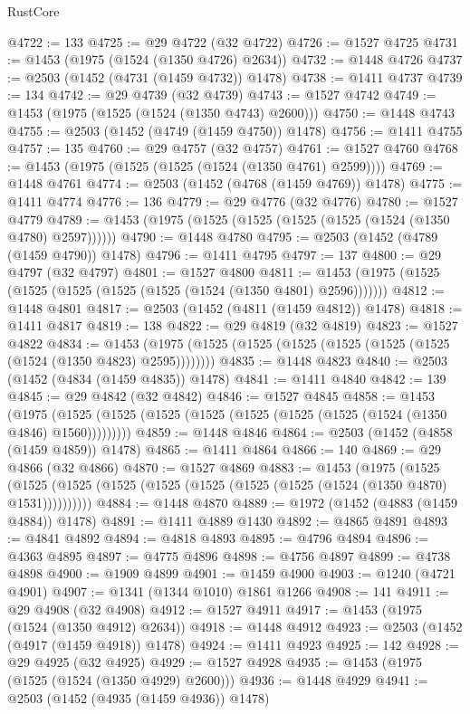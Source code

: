 \begin{lexlean}{RustCore}
\begin{coremodule}
@4722 := 133
@4725 := @29 @4722 (@32 @4722)
@4726 := @1527 @4725
@4731 := @1453 (@1975 (@1524 (@1350 @4726) @2634))
@4732 := @1448 @4726
@4737 := @2503 (@1452 (@4731 (@1459 @4732)) @1478)
@4738 := @1411 @4737
@4739 := 134
@4742 := @29 @4739 (@32 @4739)
@4743 := @1527 @4742
@4749 := @1453 (@1975 (@1525 (@1524 (@1350 @4743) @2600)))
@4750 := @1448 @4743
@4755 := @2503 (@1452 (@4749 (@1459 @4750)) @1478)
@4756 := @1411 @4755
@4757 := 135
@4760 := @29 @4757 (@32 @4757)
@4761 := @1527 @4760
@4768 := @1453 (@1975 (@1525 (@1525 (@1524 (@1350 @4761) @2599))))
@4769 := @1448 @4761
@4774 := @2503 (@1452 (@4768 (@1459 @4769)) @1478)
@4775 := @1411 @4774
@4776 := 136
@4779 := @29 @4776 (@32 @4776)
@4780 := @1527 @4779
@4789 := @1453 (@1975 (@1525 (@1525 (@1525 (@1525 (@1524 (@1350 @4780) @2597))))))
@4790 := @1448 @4780
@4795 := @2503 (@1452 (@4789 (@1459 @4790)) @1478)
@4796 := @1411 @4795
@4797 := 137
@4800 := @29 @4797 (@32 @4797)
@4801 := @1527 @4800
@4811 := @1453 (@1975 (@1525 (@1525 (@1525 (@1525 (@1525 (@1524 (@1350 @4801) @2596)))))))
@4812 := @1448 @4801
@4817 := @2503 (@1452 (@4811 (@1459 @4812)) @1478)
@4818 := @1411 @4817
@4819 := 138
@4822 := @29 @4819 (@32 @4819)
@4823 := @1527 @4822
@4834 := @1453 (@1975 (@1525 (@1525 (@1525 (@1525 (@1525 (@1525 (@1524 (@1350 @4823) @2595))))))))
@4835 := @1448 @4823
@4840 := @2503 (@1452 (@4834 (@1459 @4835)) @1478)
@4841 := @1411 @4840
@4842 := 139
@4845 := @29 @4842 (@32 @4842)
@4846 := @1527 @4845
@4858 := @1453
    (@1975 (@1525 (@1525 (@1525 (@1525 (@1525 (@1525 (@1525 (@1524 (@1350 @4846) @1560)))))))))
@4859 := @1448 @4846
@4864 := @2503 (@1452 (@4858 (@1459 @4859)) @1478)
@4865 := @1411 @4864
@4866 := 140
@4869 := @29 @4866 (@32 @4866)
@4870 := @1527 @4869
@4883 := @1453
    (@1975
      (@1525 (@1525 (@1525 (@1525 (@1525 (@1525 (@1525 (@1525 (@1524 (@1350 @4870) @1531))))))))))
@4884 := @1448 @4870
@4889 := @1972 (@1452 (@4883 (@1459 @4884)) @1478)
@4891 := @1411 @4889 @1430
@4892 := @4865 @4891
@4893 := @4841 @4892
@4894 := @4818 @4893
@4895 := @4796 @4894
@4896 := @4363 @4895
@4897 := @4775 @4896
@4898 := @4756 @4897
@4899 := @4738 @4898
@4900 := @1909 @4899
@4901 := @1459 @4900
@4903 := @1240 (@4721 @4901)
@4907 := @1341 (@1344 @1010) @1861 @1266
@4908 := 141
@4911 := @29 @4908 (@32 @4908)
@4912 := @1527 @4911
@4917 := @1453 (@1975 (@1524 (@1350 @4912) @2634))
@4918 := @1448 @4912
@4923 := @2503 (@1452 (@4917 (@1459 @4918)) @1478)
@4924 := @1411 @4923
@4925 := 142
@4928 := @29 @4925 (@32 @4925)
@4929 := @1527 @4928
@4935 := @1453 (@1975 (@1525 (@1524 (@1350 @4929) @2600)))
@4936 := @1448 @4929
@4941 := @2503 (@1452 (@4935 (@1459 @4936)) @1478)

\end{coremodule}
\end{lexlean}
